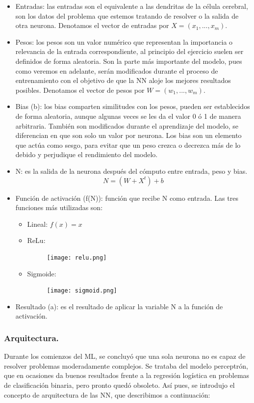 \documentclass[a4paper,11pt]{article}
\begin{document}
\begin{itemize}
    \item Entradas: las entradas son el equivalente a las dendritas de la célula cerebral, son los datos del problema que estemos tratando de resolver o la salida de otra neurona. Denotamos el vector de entradas por $X=(x_1,...,x_m)$.
    \item Pesos: los pesos son un valor numérico que representan la importancia o relevancia de la entrada correspondiente, al principio del ejercicio suelen ser definidos de forma aleatoria. Son la parte más importante del modelo, pues como veremos en adelante, serán modificados durante el proceso de entrenamiento con el objetivo de que la NN aloje los mejores resultados posibles. Denotamos el vector de pesos por $W=(w_1,...,w_m)$.
    \item Bias (b): los bias comparten similitudes con los pesos, pueden ser establecidos de forma aleatoria, aunque algunas veces se les da el valor 0 ó 1 de manera arbitraria. También son modificados durante el aprendizaje del modelo, se diferencian en que son solo un valor por neurona. Los bias son un elemento que actúa como sesgo, para evitar que un peso crezca o decrezca más de lo debido y perjudique el rendimiento del modelo.
    \item N: es la salida de la neurona después del cómputo entre entrada, peso y bias.\\                                           \[N=(W+X^t)+b\]
    \item Función de activación (f(N)): función que recibe N como entrada. Las tres funciones más utilizadas son:
    \begin{itemize}
    \item Lineal: $f(x)=x$ 
    \item ReLu: 		\begin{figure}[H]
				\centering
				\texttt{[image: relu.png]}
				\end{figure}
    \item Sigmoide: 	\begin{figure}[H]
				\centering
				\texttt{[image: sigmoid.png]}
				\end{figure}
	
    \end{itemize}
    \item Resultado (a): es el resultado de aplicar la variable N a la función de activación.
        
\end{itemize}
\subsubsection{Arquitectura.}
Durante los comienzos del ML, se concluyó que una sola neurona no es capaz de
resolver problemas moderadamente complejos. Se trataba del modelo perceptrón,
que en ocasiones da buenos resultados frente a la regresión logística en problemas
de clasificación binaria, pero pronto quedó obsoleto. Así pues, se introdujo el
concepto de arquitectura de las NN, que describimos a continuación:\\
\end{document}
